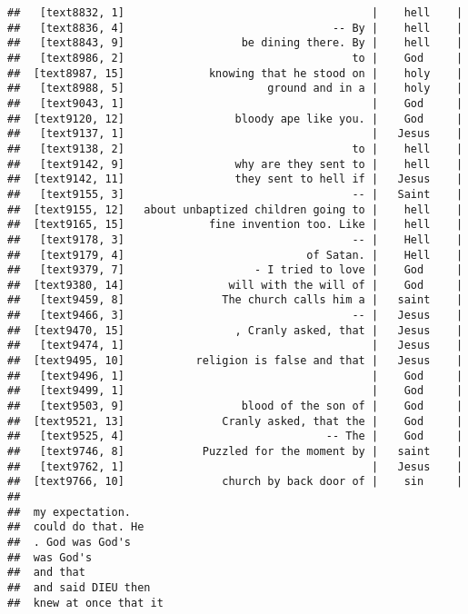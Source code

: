 \documentclass[]{article}
\begin{document}
\begin{verbatim}
##   [text8832, 1]                                      |    hell    |
##   [text8836, 4]                                -- By |    hell    |
##   [text8843, 9]                  be dining there. By |    hell    |
##   [text8986, 2]                                   to |    God     |
##  [text8987, 15]             knowing that he stood on |    holy    |
##   [text8988, 5]                      ground and in a |    holy    |
##   [text9043, 1]                                      |    God     |
##  [text9120, 12]                 bloody ape like you. |    God     |
##   [text9137, 1]                                      |   Jesus    |
##   [text9138, 2]                                   to |    hell    |
##   [text9142, 9]                 why are they sent to |    hell    |
##  [text9142, 11]                 they sent to hell if |   Jesus    |
##   [text9155, 3]                                   -- |   Saint    |
##  [text9155, 12]   about unbaptized children going to |    hell    |
##  [text9165, 15]             fine invention too. Like |    hell    |
##   [text9178, 3]                                   -- |    Hell    |
##   [text9179, 4]                            of Satan. |    Hell    |
##   [text9379, 7]                    - I tried to love |    God     |
##  [text9380, 14]                will with the will of |    God     |
##   [text9459, 8]               The church calls him a |   saint    |
##   [text9466, 3]                                   -- |   Jesus    |
##  [text9470, 15]                 , Cranly asked, that |   Jesus    |
##   [text9474, 1]                                      |   Jesus    |
##  [text9495, 10]           religion is false and that |   Jesus    |
##   [text9496, 1]                                      |    God     |
##   [text9499, 1]                                      |    God     |
##   [text9503, 9]                  blood of the son of |    God     |
##  [text9521, 13]               Cranly asked, that the |    God     |
##   [text9525, 4]                               -- The |    God     |
##   [text9746, 8]            Puzzled for the moment by |   saint    |
##   [text9762, 1]                                      |   Jesus    |
##  [text9766, 10]               church by back door of |    sin     |
##                                          
##  my expectation.                         
##  could do that. He                       
##  . God was God's                         
##  was God's                               
##  and that                                
##  and said DIEU then                      
##  knew at once that it                    

\end{verbatim}
\end{document}
